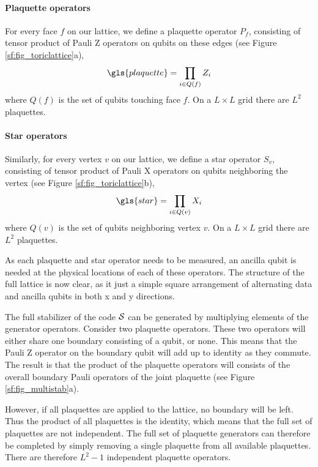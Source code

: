 \paragraph{Plaquette operators}
For every face $f$ on our lattice, we define a plaquette operator $P_f$, consisting of tensor product of Pauli Z operators on qubits on these edges (see Figure \ref{sf:fig_toriclattice}a),
\begin{equation}\label{eq:sf_plaquette}
  \gls{plaquette} = \prod_{i\in Q(f)} Z_i
\end{equation}
where $Q(f)$ is the set of qubits touching face $f$. On a $L\times L$ grid there are $L^2$ plaquettes.

\paragraph{Star operators}
Similarly, for every vertex $v$ on our lattice, we define a star operator $S_v$, consisting of tensor product of Pauli X operators on qubits neighboring the vertex (see Figure \ref{sf:fig_toriclattice}b),
\begin{equation}\label{eq:sf_star}
  \gls{star} = \prod_{i\in Q(v)} X_i
\end{equation}
where $Q(v)$ is the set of qubits neighboring vertex $v$. On a $L\times L$ grid there are $L^2$ plaquettes.

As each plaquette and star operator needs to be measured, an ancilla qubit is needed at the physical locations of each of these operators. The structure of the full lattice is now clear, as it just a simple square arrangement of alternating data and ancilla qubits in both x and y directions.

The full stabilizer of the code $\mathcal{S}$ can be generated by multiplying elements of the generator operators. Consider two plaquette operators. These two operators will either share one boundary consisting of a qubit, or none. This means that the Pauli Z operator on the boundary qubit will add up to identity as they commute. The result is that the product of the plaquette operators will consists of the overall boundary Pauli operators of the joint plaquette (see Figure \ref{sf:fig_multistab}a).

However, if all plaquettes are applied to the lattice, no boundary will be left. Thus the product of all plaquettes is the identity, which means that the full set of plaquettes are not independent. The full set of plaquette generators can therefore be completed by simply removing a single plaquette from all available plaquettes. There are therefore $L^2 - 1$ independent plaquette operators.

